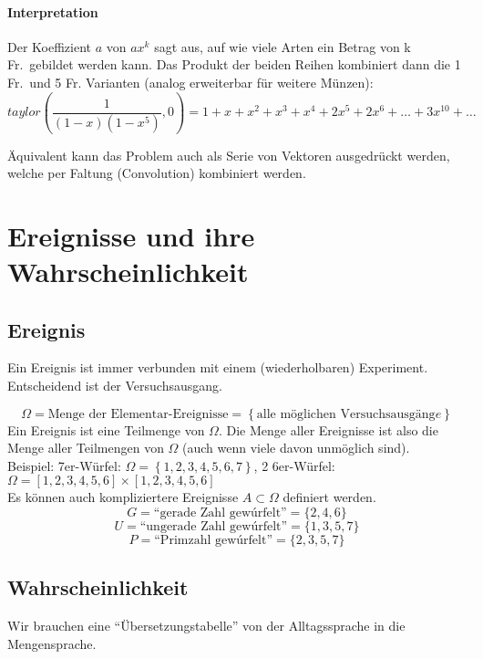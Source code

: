 \documentclass[10pt,a4paper]{scrartcl}
\begin{document}
\paragraph{Interpretation}
Der Koeffizient $a$ von $ax^k$ sagt aus, auf wie viele Arten ein Betrag von k Fr.\ gebildet werden kann. Das Produkt der beiden Reihen kombiniert dann die 1 Fr.\ und 5 Fr. Varianten (analog erweiterbar für weitere Münzen):
$$taylor\left(\frac{1}{(1-x)(1-x^5)}, 0\right) = 1 + x + x^2 + x^3 + x^4 + 2x^5 + 2x^6 + \dots + 3x^{10} + \dots$$

Äquivalent kann das Problem auch als Serie von Vektoren ausgedrückt werden, welche per Faltung (Convolution) kombiniert werden.

\section{Ereignisse und ihre Wahrscheinlichkeit}
\subsection{Ereignis}
Ein Ereignis ist immer verbunden mit einem (wiederholbaren) Experiment. Entscheidend ist der Versuchsausgang.

$$\Omega = \mbox{Menge der Elementar-Ereignisse} = \left\{ \mbox{alle möglichen Versuchsausgäng}e \right\}$$
Ein Ereignis ist eine Teilmenge von $\Omega$. Die Menge aller Ereignisse ist also die Menge aller Teilmengen von $\Omega$ (auch wenn viele davon unmöglich sind). \\
Beispiel: 7er-Würfel: $\Omega = \left\{ 1, 2, 3, 4, 5, 6, 7 \right\}$, 
2 6er-Würfel: $\Omega = \left[1, 2, 3, 4, 5, 6\right] \times \left[1, 2, 3, 4 ,5, 6\right]$
\\ \linebreak
Es können auch kompliziertere Ereignisse $A \subset \Omega$ definiert werden.
$$G = \mbox{``gerade Zahl gewúrfelt''} = \{2, 4, 6\}$$
$$U = \mbox{``ungerade Zahl gewúrfelt''} = \{1, 3, 5, 7\}$$
$$P = \mbox{``Primzahl gewúrfelt''} = \{2, 3, 5, 7\}$$

\subsection{Wahrscheinlichkeit}
Wir brauchen eine ``Übersetzungstabelle'' von der Alltagssprache in die Mengensprache. 
\end{document}
